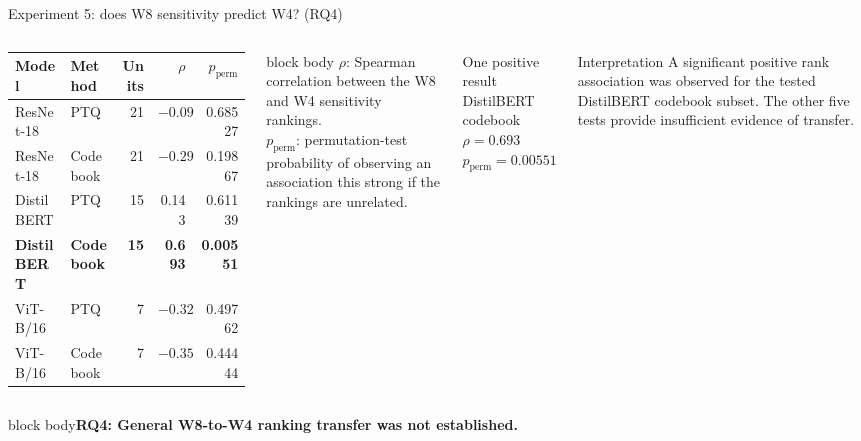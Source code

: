 \documentclass[aspectratio=169,10pt]{beamer}
\newcommand{\takeaway}[1]{\vfill\begin{beamercolorbox}[wd=\textwidth,sep=1.5mm,rounded=true]{block body}\centering\small\bfseries #1\end{beamercolorbox}}
\begin{document}
\begin{frame}{Experiment 5: does W8 sensitivity predict W4? (RQ4)}
\begin{columns}[c,onlytextwidth]
\centering
\scriptsize
\begin{tabular}{llrrr}
\toprule
Model & Method & Units & $\rho$ & $p_{\mathrm{perm}}$\\
\midrule
ResNet-18 & PTQ & 21 & $-0.094$ & 0.68527\\
ResNet-18 & Codebook & 21 & $-0.292$ & 0.19867\\
DistilBERT & PTQ & 15 & 0.143 & 0.61139\\
\textbf{DistilBERT} & \textbf{Codebook} & \textbf{15} & \textbf{0.693} & \textbf{0.00551}\\
ViT-B/16 & PTQ & 7 & $-0.321$ & 0.49762\\
ViT-B/16 & Codebook & 7 & $-0.357$ & 0.44444\\
\bottomrule
\end{tabular}
\vspace{2mm}

\begin{beamercolorbox}[wd=\linewidth,sep=1.2mm,rounded=true]{block body}
\scriptsize
$\rho$: Spearman correlation between the W8 and W4 sensitivity rankings.\\[1mm]
$p_{\mathrm{perm}}$: permutation-test probability of observing an association this strong if the rankings are unrelated.
\end{beamercolorbox}
\begin{block}{One positive result}
\centering
\normalsize DistilBERT codebook\\[1mm]
\textcolor{TUIl-orange}{\bfseries $\rho=0.693$}\\
\textcolor{TUIl-orange}{\bfseries $p_{\mathrm{perm}}=0.00551$}
\end{block}
\begin{alertblock}{Interpretation}
\scriptsize A significant positive rank association was observed for the tested DistilBERT codebook subset. The other five tests provide insufficient evidence of transfer.
\end{alertblock}
\end{columns}
\takeaway{RQ4: General W8-to-W4 ranking transfer was not established.}
\end{frame}
\end{document}

